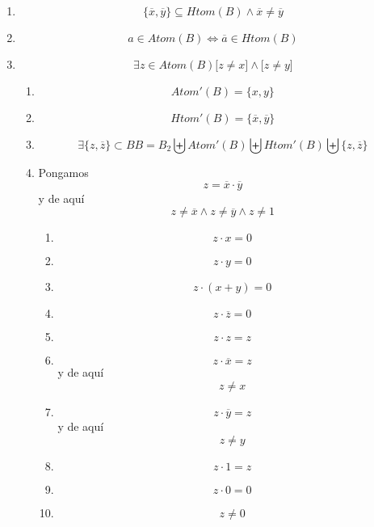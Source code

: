 \documentclass[
]{article}
\providecommand{\tightlist}{%
  \setlength{\itemsep}{0pt}\setlength{\parskip}{0pt}}
\begin{document}
\begin{enumerate}
\begin{enumerate}
\begin{enumerate}
\begin{enumerate}
\begin{enumerate}
\begin{enumerate}
\begin{enumerate}
              \begin{enumerate}
              \def\labelenumviii{\arabic{enumviii}.}
              \tightlist
              \item
                \[{{{({z \cdot a})} + \overline{a}} = {0 + \overline{a}}} = \overline{a}\]
              \item
                \[{z + \overline{a}} = \overline{a}\]
              \end{enumerate}
            \end{enumerate}
          \end{enumerate}
        \end{enumerate}
      \item
        \[{{\{{\overline{x},\overline{y}}\}} \subseteq \mathit{Htom}}{{{(B)} \land \overline{x}} \neq \overline{y}}\]
      \item
        \[{a \in \mathit{Atom}}{(B)}\Leftrightarrow{\overline{a} \in \mathit{Htom}}{(B)}\]
      \item
        \[\exists{z \in \mathit{Atom}}{(B)}{{\lbrack{z \neq x}\rbrack} \land {\lbrack{z \neq y}\rbrack}}\]

        \begin{enumerate}
        \def\labelenumv{\arabic{enumv}.}
        \item
          \[\mathit{Atom}'{{(B)} = {\{{x,y}\}}}\]
        \item
          \[\mathit{Htom}'{{(B)} = {\{{\overline{x},\overline{y}}\}}}\]
        \item
          \[\exists{{\{{z,\overline{z}}\}} \subset B}{B = B_{2}}\biguplus{\mathit{Atom}'{(B)}}\biguplus{\mathit{Htom}'{(B)}}\biguplus{\{{z,\overline{z}}\}}\]
        \item
          Pongamos \[z = {\overline{x} \cdot \overline{y}}\] y de
          aquí\[{{z \neq {\overline{x} \land z}} \neq {\overline{y} \land z}} \neq 1\]

          \begin{enumerate}
          \def\labelenumvi{\arabic{enumvi}.}
          \item
            \[{z \cdot x} = 0\]
          \item
            \[{z \cdot y} = 0\]
          \item
            \[{z \cdot {({x + y})}} = 0\]
          \item
            \[{z \cdot \overline{z}} = 0\]
          \item
            \[{z \cdot z} = z\]
          \item
            \[{z \cdot \overline{x}} = z\] y de aquí \[z \neq x\]
          \item
            \[{z \cdot \overline{y}} = z\]y de aquí \[z \neq y\]
          \item
            \[{z \cdot 1} = z\]
          \item
            \[{z \cdot 0} = 0\]
          \item
            \[z \neq 0\]


\end{enumerate}
\end{enumerate}
\end{enumerate}
\end{enumerate}
\end{enumerate}
\end{enumerate}
\end{document}
